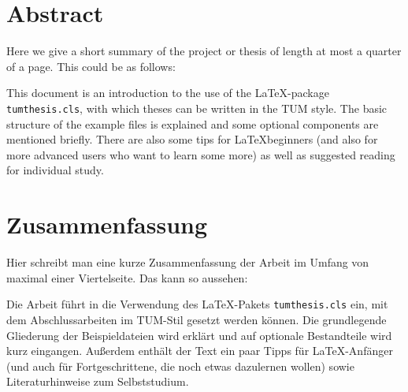 \cleardoublepage

\section*{Abstract}
Here we give a short summary of the project or thesis of length at most a quarter of a page. This could be \eg as follows:

This document is an introduction to the use of the \LaTeX-package \texttt{tumthesis.cls}, with which theses can be written in the TUM style. The basic structure of the example files is explained and some optional components are mentioned briefly. There are also some tips for \LaTeX beginners (and also for more advanced users who want to learn some more) as well as suggested reading for individual study.


\section*{Zusammenfassung}
Hier schreibt man eine kurze Zusammenfassung der Arbeit im Umfang von maximal einer Viertelseite. Das kann \eg so aussehen:

Die Arbeit führt in die Verwendung des \LaTeX-Pakets \texttt{tumthesis.cls} ein, mit dem Abschlussarbeiten im TUM-Stil gesetzt werden können. Die grundlegende Gliederung der Beispieldateien wird erklärt und auf optionale Bestandteile wird kurz eingangen. Außerdem enthält der Text ein paar Tipps für \LaTeX-Anfänger (und auch für Fortgeschrittene, die noch etwas dazulernen wollen) sowie Literaturhinweise zum Selbststudium.


